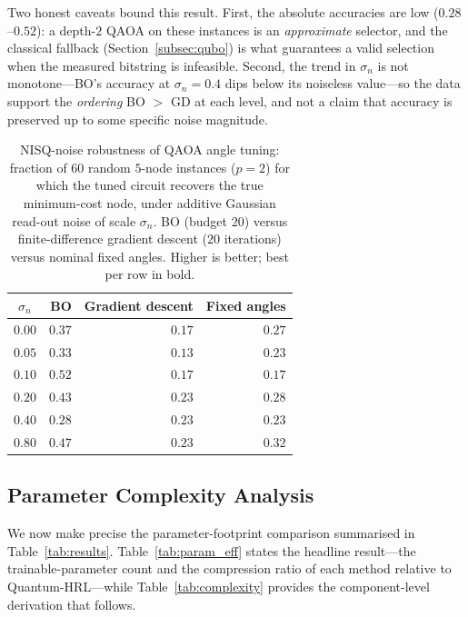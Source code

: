 \documentclass[11pt,a4paper]{article}
\theoremstyle{definition}
\begin{document}
Two honest caveats bound this result. First, the absolute accuracies are low ($0.28$--$0.52$): a depth-$2$ QAOA on these instances is an \emph{approximate} selector, and the classical fallback (Section~\ref{subsec:qubo}) is what guarantees a valid selection when the measured bitstring is infeasible. Second, the trend in $\sigma_n$ is not monotone---BO's accuracy at $\sigma_n{=}0.4$ dips below its noiseless value---so the data support the \emph{ordering} BO $>$ GD at each level, and not a claim that accuracy is preserved up to some specific noise magnitude.

\begin{table}[t]
\centering
\caption{NISQ-noise robustness of QAOA angle tuning: fraction of $60$ random $5$-node instances ($p{=}2$) for which the tuned circuit recovers the true minimum-cost node, under additive Gaussian read-out noise of scale $\sigma_n$. BO (budget $20$) versus finite-difference gradient descent ($20$ iterations) versus nominal fixed angles. Higher is better; best per row in bold.}
\label{tab:noise}
\begin{tabular}{@{}crrr@{}}
\toprule
\textbf{$\sigma_n$} & \textbf{BO} & \textbf{Gradient descent} & \textbf{Fixed angles} \\
\midrule
$0.00$ & $\mathbf{0.37}$ & $0.17$ & $0.27$ \\
$0.05$ & $\mathbf{0.33}$ & $0.13$ & $0.23$ \\
$0.10$ & $\mathbf{0.52}$ & $0.17$ & $0.17$ \\
$0.20$ & $\mathbf{0.43}$ & $0.23$ & $0.28$ \\
$0.40$ & $\mathbf{0.28}$ & $0.23$ & $0.23$ \\
$0.80$ & $\mathbf{0.47}$ & $0.23$ & $0.32$ \\
\bottomrule
\end{tabular}
\end{table}

\subsection{Parameter Complexity Analysis}
\label{subsec:complexity}

We now make precise the parameter-footprint comparison summarised in Table~\ref{tab:results}. Table~\ref{tab:param_eff} states the headline result---the trainable-parameter count and the compression ratio of each method relative to Quantum-HRL---while Table~\ref{tab:complexity} provides the component-level derivation that follows.
\end{document}
